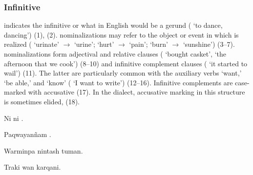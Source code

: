 {\subsubsection{Infinitive }\label{sssc:inf}
 indicates the infinitive or what in English would be a gerund ( `to dance, dancing') (1), (2).  nominalizations may refer to the object or event in which  is realized ( `urinate' $\rightarrow$  `urine';  `hurt' $\rightarrow $  `pain';  `burn' $\rightarrow $  `sunshine') (3--7).  nominalizations form adjectival and relative clauses ( `bought casket',  `the afternoon that we cook') (8--10) and infinitive complement clauses ( `it started to wail') (11). The latter are particularly common with the auxiliary verbs  `want,'  `be able,' and  `know' ( `I want to write') (12--16). Infinitive complements are case-marked with accusative  (17). In the \CH{} dialect, accusative marking in this structure is sometimes elided, (18).

%
{Ni  ni .}%
{}%
{}{}%

%
{Paqwayan\~nam .}%
{}%
{}{}%

%
{Warminpa nintash tuman.}%
{}%
{}{}%

%
{Traki wan karqani.}%
{}%
{}{}%

}
